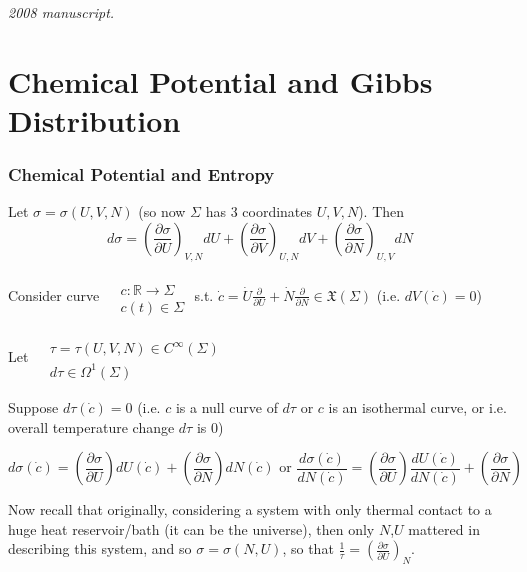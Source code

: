\noindent\textit{2008 manuscript.}

\section{Chemical Potential and Gibbs Distribution}

\subsubsection*{Chemical Potential and Entropy}

Let $\sigma = \sigma(U,V,N)$ (so now $\Sigma$ has 3 coordinates $U,V,N$).  Then
\[
d\sigma = \left( \frac{ \partial \sigma}{\partial U}\right)_{V,N}dU + \left( \frac{ \partial \sigma}{\partial V}\right)_{U,N} dV + \left( \frac{ \partial \sigma}{\partial N}\right)_{U,V}dN
\]

Consider curve $\begin{aligned} & \quad \\
  & c : \mathbb{R} \to \Sigma \\
  & c(t) \in \Sigma \end{aligned}$ s.t. $\dot{c} = \dot{U} \frac{ \partial }{ \partial U} + \dot{N} \frac{ \partial }{ \partial N} \in \mathfrak{X}(\Sigma)$ (i.e. $dV(\dot{c}) = 0$)

Let $\begin{aligned} & \quad \\
  & \tau = \tau(U,V, N) \in C^{\infty}(\Sigma) \\
  & d\tau \in \Omega^1(\Sigma) \end{aligned}$

Suppose $d\tau(\dot{c})=0$ (i.e. $c$ is a null curve of $d\tau$ or $c$ is an isothermal curve, or i.e. overall temperature change $d\tau $ is $0$)


\[
d\sigma(\dot{c}) = \left( \frac{ \partial \sigma }{ \partial U } \right) dU(\dot{c}) + \left( \frac{ \partial \sigma }{ \partial N} \right) dN(\dot{c}) \text{ or } \frac{d\sigma(\dot{c})}{ dN(\dot{c})} = \left( \frac{ \partial \sigma}{ \partial U} \right) \frac{dU(\dot{c})}{ dN(\dot{c})} + \left( \frac{ \partial \sigma}{ \partial N} \right)
\]

Now recall that originally, considering a system with only thermal contact to a huge heat reservoir/bath (it can be the universe), then only $N$,$U$ mattered in describing this system, and so $\sigma = \sigma(N,U)$, so that $\frac{1}{\tau} = \left( \frac{ \partial \sigma}{ \partial U}\right)_N$.  

